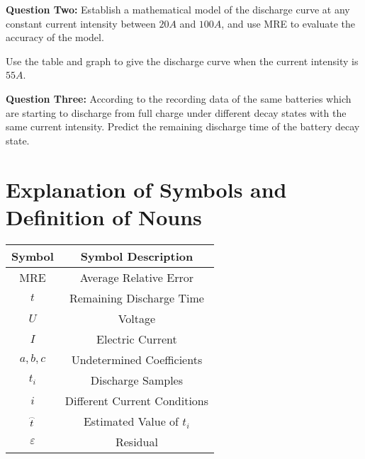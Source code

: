 \documentclass[conference]{IEEEtran}
\begin{document}
\textbf{Question Two: }  Establish a mathematical model of the discharge curve at any constant current intensity between $20A$ and $100A$, and use MRE to evaluate the accuracy of the model. 

Use the table and graph to give the discharge curve when the current intensity is $55A$.

\textbf{Question Three: } According to the recording data of the same batteries which are starting to discharge from full charge under different decay states with the same current intensity. Predict the remaining discharge time of the battery decay state.



\section{Explanation of Symbols and Definition of Nouns}


\begin{table}[htbp]
	\begin{center}
		\begin{tabular}{cc}
			\toprule[1.5pt]
			Symbol & Symbol Description \\
	     	\midrule[1pt]
	     	MRE & Average Relative Error \\
	     	$t$ & Remaining Discharge Time \\
	        $U$ &	Voltage \\
	        $I$ &	Electric Current \\
	        $a,b,c$    &	Undetermined Coefficients \\
	         $t_i$   &	Discharge Samples \\
	   $i$  &	Different Current Conditions\\
	    $\mathord{\buildrel{\lower3pt\hbox{$\scriptscriptstyle\frown$}} 
	    	\over t} $ &	Estimated Value of  $t_i$ 
 \\
	    $\varepsilon $ &	Residual \\
			\bottomrule[1.5pt]
		\end{tabular}
	\end{center}
\end{table}

~\\
~\\
\end{document}
